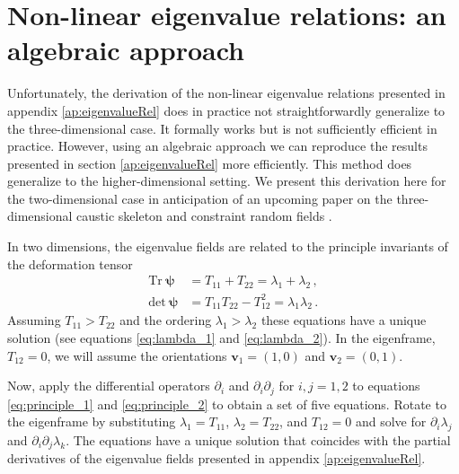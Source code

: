 \documentclass[a4paper, 11pt]{article}
\begin{document}
\section{Non-linear eigenvalue relations: an algebraic approach}\label{ap:eigenvalueRel_alt}
Unfortunately, the derivation of the non-linear eigenvalue relations presented in appendix \ref{ap:eigenvalueRel} does in practice not straightforwardly generalize to the three-dimensional case. It formally works but is not sufficiently efficient in practice. However, using an algebraic approach we can reproduce the results presented in section \ref{ap:eigenvalueRel} more efficiently. This method does generalize to the higher-dimensional setting. We present this derivation here for the two-dimensional case in anticipation of an upcoming paper on the three-dimensional caustic skeleton and constraint random fields \cite{Feldbrugge:2022}.

In two dimensions, the eigenvalue fields are related to the principle invariants of the deformation tensor
\begin{align}
\text{Tr}\ \bm{\psi} &= T_{11} + T_{22} = \lambda_1 + \lambda_2\,,\label{eq:principle_1}\\
\text{det}\ \bm{\psi} &=  T_{11}  T_{22} - T_{12}^2 = \lambda_1 \lambda_2\,.\label{eq:principle_2}
\end{align}
Assuming $T_{11} > T_{22}$ and the ordering $\lambda_1> \lambda_2$ these equations have a unique solution (see equations \eqref{eq:lambda_1} and \eqref{eq:lambda_2}). In the eigenframe, $T_{12}=0$, we will assume the orientations $\bm{v}_1=(1,0)$ and $\bm{v}_2=(0,1)$. 

Now, apply the differential operators $\partial_i$ and $\partial_{i}\partial_j$ for $i,j=1,2$ to equations \eqref{eq:principle_1} and \eqref{eq:principle_2} to obtain a set of five equations. Rotate to the eigenframe by substituting $\lambda_1 = T_{11}$, $\lambda_2=T_{22}$, and $T_{12}=0$ and solve for $\partial_i\lambda_j$ and $\partial_i \partial_j \lambda_k$. The equations have a unique solution that coincides with the partial derivatives of the eigenvalue fields presented in appendix \ref{ap:eigenvalueRel}.
\end{document}
